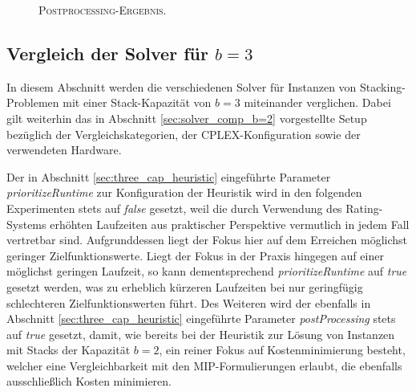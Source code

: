 \begin{figure}[H]
  \centering
    \caption{\textsc{Postprocessing-Ergebnis.}}
    \label{fig:valid_solution_post_processing}
\end{figure}

\subsection{Vergleich der Solver für $b = 3$}
\label{sec:solver_comp_b=3}

In diesem Abschnitt werden die verschiedenen Solver für Instanzen von Stacking-Problemen mit einer Stack-Kapazität
von $b = 3$ miteinander verglichen. Dabei gilt weiterhin das in Abschnitt \ref{sec:solver_comp_b=2} vorgestellte Setup
bezüglich der Vergleichskategorien, der \textsc{CPLEX}-Konfiguration sowie der verwendeten Hardware.

Der in Abschnitt \ref{sec:three_cap_heuristic} eingeführte Parameter \textit{prioritizeRuntime} zur Konfiguration der Heuristik
wird in den folgenden Experimenten stets auf \textit{false} gesetzt, weil die durch Verwendung des Rating-Systems erhöhten Laufzeiten
aus praktischer Perspektive vermutlich in jedem Fall vertretbar sind. Aufgrunddessen liegt der Fokus hier auf dem Erreichen
möglichst geringer Zielfunktionswerte. Liegt der Fokus in der Praxis hingegen auf einer möglichst geringen Laufzeit, so kann dementsprechend \textit{prioritizeRuntime} auf \textit{true} gesetzt werden, was zu erheblich kürzeren Laufzeiten bei nur geringfügig schlechteren Zielfunktionswerten führt.
Des Weiteren wird der ebenfalls in Abschnitt \ref{sec:three_cap_heuristic} eingeführte Parameter \textit{postProcessing}
stets auf \textit{true} gesetzt, damit, wie bereits bei der Heuristik zur Lösung von Instanzen mit Stacks der Kapazität $b = 2$,
ein reiner Fokus auf Kostenminimierung besteht, welcher eine Vergleichbarkeit mit den MIP-Formulierungen erlaubt, die ebenfalls
ausschließlich Kosten minimieren.

